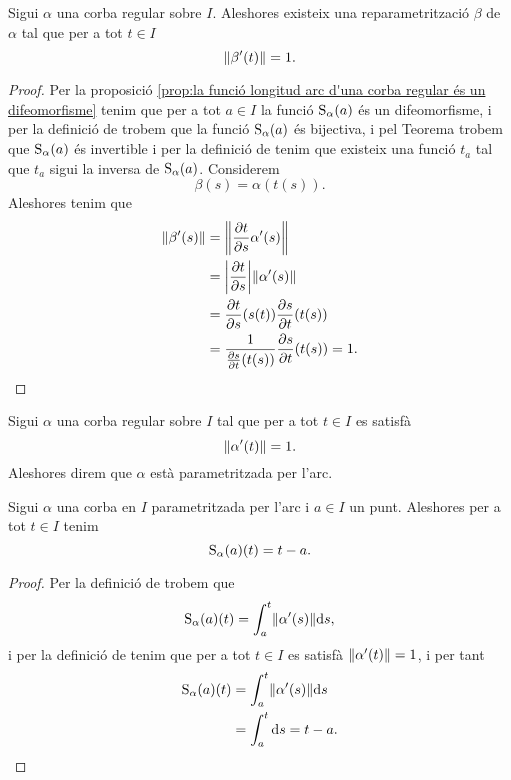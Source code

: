 \documentclass[../Apunts.tex]{subfiles}
\begin{document}
	\begin{proposition} %
		\label{prop:podem trobar una reparametrització amb velocitat unitaria de qualsevol corba regular}
		Sigui \(\alpha\) una corba regular sobre \(I\). Aleshores existeix una reparametrització \(\beta\) de \(\alpha\) tal que per a tot \(t\in I\)
		\[\norm{\beta'(t)}=1.\]
		\begin{proof}
			Per la proposició \ref{prop:la funció longitud arc d'una corba regular és un difeomorfisme} tenim que per a tot \(a\in I\) la funció \(\operatorname{S}_{\alpha}(a)\) és un difeomorfisme, i per la definició de  trobem que la funció \(\operatorname{S}_{\alpha}(a)\) és bijectiva, i pel Teorema  trobem que \(\operatorname{S}_{\alpha}(a)\) és invertible i per la definició de  tenim que existeix una funció \(t_{a}\) tal que \(t_{a}\) sigui la inversa de \(\operatorname{S}_{\alpha}(a)\). Considerem
			\[\beta(s)=\alpha(t(s)).\]
			Aleshores tenim que
			\begin{align*} %
				\norm{\beta'(s)}&=\norm{\frac{\partial t}{\partial s}\alpha'(s)} \\
				&=\abs{\frac{\partial t}{\partial s}}\norm{\alpha'(s)} \\
				&=\frac{\partial t}{\partial s}(s(t))\frac{\partial s}{\partial t}(t(s))\\
				&=\frac{1}{\frac{\partial s}{\partial t}(t(s))}\frac{\partial s}{\partial t}(t(s))=1. \qedhere
			\end{align*}
		\end{proof}
	\end{proposition}
	\begin{definition}
		\label{def:corba parametritzada per l'arc}
		Sigui \(\alpha\) una corba regular sobre \(I\) tal que per a tot \(t\in I\) es satisfà
		\[\norm{\alpha'(t)}=1.\]
		Aleshores direm que \(\alpha\) està parametritzada per l'arc.
	\end{definition}
	\begin{observation}
		Sigui \(\alpha\) una corba en \(I\) parametritzada per l'arc i \(a\in I\) un punt. Aleshores per a tot \(t\in I\) tenim
		\[\operatorname{S}_{\alpha}(a)(t)=t-a.\]
		\begin{proof}
			Per la definició de  trobem que
			\[\funciolongituddarc_{\alpha}(a)(t)=\int_{a}^{t}\norm{\alpha'(s)}\diff s,\]
			i per la definició de  tenim que  per a tot \(t\in I\) es satisfà \(\norm{\alpha'(t)}=1\), i per tant
			\begin{align*}
				\funciolongituddarc_{\alpha}(a)(t)&=\int_{a}^{t}\norm{\alpha'(s)}\diff s \\
				&=\int_{a}^{t}\diff s=t-a.\qedhere
			\end{align*}
		\end{proof}
	\end{observation}
\end{document}
